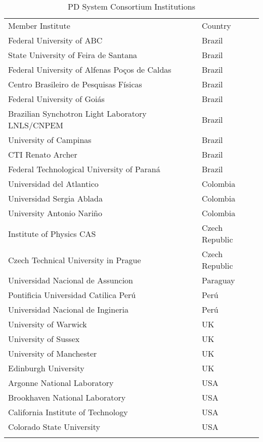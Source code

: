 \begin{longtable}
{ll}
\caption{PD System Consortium Institutions}\\ \colhline
\rowcolor{dunetablecolor} Member Institute  &  Country       \\  \toprowrule
Federal University of ABC & Brazil \\ \colhline
State University of Feira de Santana & Brazil \\ \colhline
Federal University of Alfenas Po\c{c}os de Caldas & Brazil \\ \colhline
Centro Brasileiro de Pesquisas F\'isicas & Brazil \\ \colhline
Federal University of Goi\'as & Brazil \\ \colhline
Brazilian Synchotron Light Laboratory LNLS/CNPEM & Brazil \\ \colhline
University of Campinas & Brazil \\ \colhline
CTI Renato Archer & Brazil \\ \colhline
Federal Technological University of Paran\'a & Brazil \\ \colhline
Universidad del Atlantico & Colombia \\ \colhline
Universidad Sergia Ablada & Colombia \\ \colhline
University Antonio Nari\~{n}o & Colombia \\ \colhline
Institute of Physics CAS & Czech Republic \\ \colhline
Czech Technical University in Prague & Czech Republic \\ \colhline
Universidad Nacional de Assuncion & Paraguay \\ \colhline
Pontificia Universidad Catilica Per\'{u} & Per\'{u} \\ \colhline
Universidad Nacional de Ingineria & Per\'{u} \\ \colhline
University of Warwick & UK \\ \colhline
University of Sussex & UK \\ \colhline
University of Manchester & UK \\ \colhline
Edinburgh University & UK \\ \colhline
Argonne National Laboratory & USA \\\colhline
Brookhaven National Laboratory & USA \\ \colhline
California Institute of Technology & USA \\ \colhline
Colorado State University   &  USA  \\ \colhline

\end{longtable}
